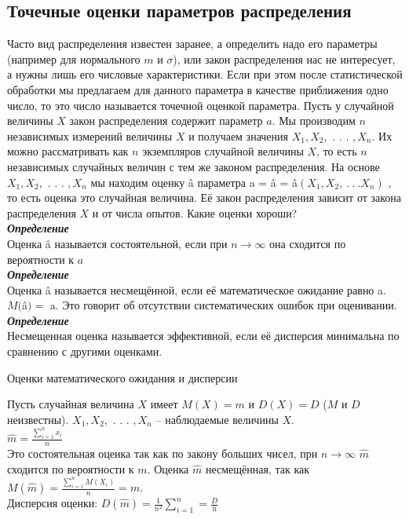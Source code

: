\documentclass[russian, 12pt, fleqn]{article}
\begin{document}
\subsection{Точечные оценки параметров распределения}
\noindent
Часто вид распределения известен заранее, а определить надо его параметры (например для нормального $m$ и $\sigma$), или закон распределения нас не интересует, а нужны лишь его числовые характеристики.  Если при этом после статистической обработки мы предлагаем для данного параметра в качестве приближения одно число, то это число называется точечной оценкой параметра. Пусть у случайной величины $X$ закон распределения содержит параметр $a$. Мы производим $n$ независимых измерений величины $X$ и получаем значения $X_1, X_2, $ . . . $,X_n$. Их можно рассматривать как $n$ экземпляров случайной величины $X$, то есть $n$ независимых случайных величин с тем же законом распределения. На основе $X_1, X_2, $ . . . $,X_n$ мы находим оценку â параметра a = â  = â$(X_1, X_2, \ .\ .\ . X_n)$ , то есть оценка это случайная величина. Её закон распределения зависит от закона распределения $X$ и от числа опытов. Какие оценки хороши?\\
\textit{\textbf{Определение}} \\
Оценка â называется состоятельной, если при $n \rightarrow \infty$ она сходится по вероятности к $a$\\
\textit{\textbf{Определение}} \\
Оценка â называется несмещённой, если её математическое ожидание равно a. $M($â$) = $ a. Это говорит об отсутствии систематических ошибок при оценивании.\\
\textit{\textbf{Определение}} \\
Несмещенная оценка называется эффективной, если её дисперсия минимальна по сравнению с другими оценками.
\begin{center}
$\textbf{Оценки математического ожидания и дисперсии}$
\end{center}
Пусть случайная величина $X$ имеет $M(X) = m$ и $D(X) = D$ ($M$ и $D$ неизвестны). $X_1, X_2, $ . . . $,X_n$ -- наблюдаемые величины $X$.\\
 $\hat{m} =  \frac{\displaystyle{\sum \limits_{i = 1}^{ n }}x_i}{n} $ \normalsize\\
Это состоятельная оценка так как по закону больших чисел, при $n \rightarrow \infty$  $\hat{m}$ сходится по вероятности к $m$. Оценка $\hat{m}$ несмещённая, так как \\$M(\hat{m}) =\frac{  \displaystyle{\sum \limits_{i = 1}^{n}} M(X_i)  }{n} = m$.\\ Дисперсия оценки: $D(\hat{m}) = \frac{1}{n^2} \displaystyle{\sum \limits_{i = 1}^{n}}  = \frac{D}{n}$\\
\end{document}
